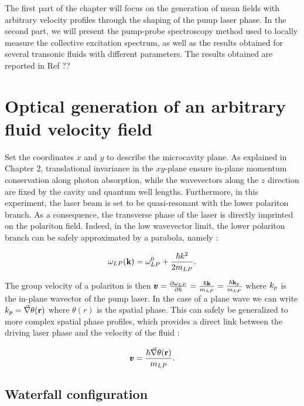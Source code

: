 The first part of the chapter will focus on the generation of mean fields with arbitrary velocity profiles through the shaping of the pump laser phase. In the second part, we will present the pump-probe spectroscopy method used to locally measure the collective excitation spectrum, as well
as the results obtained for several transonic fluids with different parameters. The results obtained are reported in Ref ??

\section{Optical generation of an arbitrary fluid velocity field}


Set the coordinates $x$ and $y$ to describe the microcavity plane. As explained in Chapter 2, translational invariance in the $xy$-plane ensure in-plane momentum conservation along photon absorption, while the wavevectors along the
$z$ direction are fixed by the cavity and quantum well lengths. Furthermore, in this experiment, the laser beam is set to be quasi-resonant with the lower polariton branch. As a consequence, the transverse phase of the laser is directly imprinted on the polariton field.
Indeed, in the low wavevector limit, the lower polariton branch can be safely approximated by a parabola, namely :

\begin{equation}
    \omega_{LP}(\mathbf{k}) = \omega_{LP}^0 + \dfrac{\hbar k^2}{2m_{LP}}.
\end{equation}

The group velocity of a polariton is then $\pmb{v} = \frac{\partial \omega_{LP}}{\partial k} = \frac{\hbar \mathbf{k}}{m_{LP}}= \frac{\hbar \mathbf{k}_p}{m_{LP}}$ where $k_p$ is the in-plane wavector of the pump laser.
In the case of a plane wave we can write $k_p=\vec{\nabla}\theta(\mathbf{r})$ where $\theta(r)$ is the spatial phase. This can safely be generalized to more complex spatial phase profiles,
which provides a direct link between the driving laser phase and the velocity of the fluid :

\begin{equation}
    \pmb{v} = \dfrac{\hbar \vec{\nabla} \theta(\mathbf{r})}{m_{LP}} .
\end{equation}

\subsection{Waterfall configuration}

